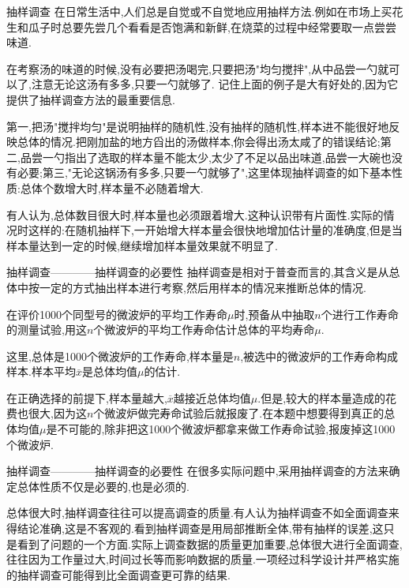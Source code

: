 \begin{frame}{抽样调查}
在日常生活中,人们总是自觉或不自觉地应用抽样方法.例如在市场上买花生和瓜子时总要先尝几个看看是否饱满和新鲜,在烧菜的过程中经常要取一点尝尝味道.

在考察汤的味道的时候,没有必要把汤喝完,只要把汤"均匀搅拌",从中品尝一勺就可以了,注意无论这汤有多多,只要一勺就够了.
记住上面的例子是大有好处的,因为它提供了抽样调查方法的最重要信息.

第一,把汤"搅拌均匀"是说明抽样的随机性,没有抽样的随机性,样本进不能很好地反映总体的情况.把刚加盐的地方舀出的汤做样本,你会得出汤太咸了的错误结论;第二,品尝一勺指出了选取的样本量不能太少,太少了不足以品出味道,品尝一大碗也没有必要;第三,"无论这锅汤有多多,只要一勺就够了",这里体现抽样调查的如下基本性质:总体个数增大时,样本量不必随着增大.

有人认为,总体数目很大时,样本量也必须跟着增大.这种认识带有片面性.实际的情况时这样的:在随机抽样下,一开始增大样本量会很快地增加估计量的准确度,但是当样本量达到一定的时候,继续增加样本量效果就不明显了.
\end{frame}

\begin{frame}{抽样调查————抽样调查的必要性}
抽样调查是相对于普查而言的,其含义是从总体中按一定的方式抽出样本进行考察,然后用样本的情况来推断总体的情况.

在评价1000个同型号的微波炉的平均工作寿命$\mu$时,预备从中抽取$n$个进行工作寿命的测量试验,用这$n$个微波炉的平均工作寿命估计总体的平均寿命$\mu$.

这里,总体是1000个微波炉的工作寿命,样本量是$n$,被选中的微波炉的工作寿命构成样本.样本平均$\overline{x}$是总体均值$\mu$的估计.

在正确选择的前提下,样本量越大,$\overline{x}$越接近总体均值$\mu$.但是,较大的样本量造成的花费也很大,因为这$n$个微波炉做完寿命试验后就报废了.在本题中想要得到真正的总体均值$\mu$是不可能的,除非把这1000个微波炉都拿来做工作寿命试验,报废掉这1000个微波炉.
\end{frame}

\begin{frame}{抽样调查————抽样调查的必要性}
在很多实际问题中,采用抽样调查的方法来确定总体性质不仅是必要的,也是必须的.

总体很大时,抽样调查往往可以提高调查的质量.有人认为抽样调查不如全面调查来得结论准确,这是不客观的.看到抽样调查是用局部推断全体,带有抽样的误差,这只是看到了问题的一个方面.实际上调查数据的质量更加重要,总体很大进行全面调查,往往因为工作量过大,时间过长等而影响数据的质量.一项经过科学设计并严格实施的抽样调查可能得到比全面调查更可靠的结果.
\end{frame}

